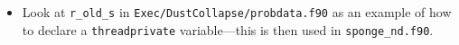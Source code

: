 \begin{itemize}
\begin{itemize}
\item Look at {\tt r\_old\_s} in {\tt Exec/DustCollapse/probdata.f90} as an
  example of how to declare a {\tt threadprivate} variable---this is then used
  in {\tt sponge\_nd.f90}.

\end{itemize}

\end{itemize}


